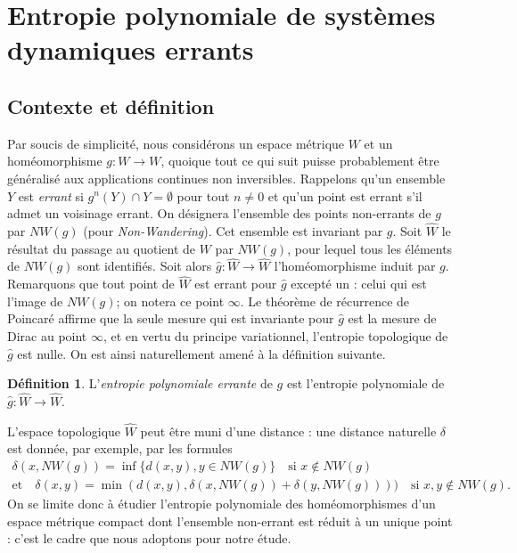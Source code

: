 \documentclass[11pt]{article}
\theoremstyle{definition}
\newtheorem{defi}[theo]{Définition}
\numberwithin{equation}{section}
\numberwithin{figure}{section}
\numberwithin{table}{section}
\let\hat\widehat
\begin{document}
\section{Entropie polynomiale de systèmes dynamiques errants}\label{s.wandering}

\subsection{Contexte et définition}

Par soucis de simplicité, nous considérons un espace métrique $W$ et un homéomorphisme $g: W \to W$, quoique tout ce qui suit puisse probablement être généralisé aux applications continues non inversibles. Rappelons qu'un ensemble $Y$ est \emph{errant} si $g^n(Y) \cap Y =\emptyset$ pour tout $n \neq 0$ et qu'un point est errant s'il admet un voisinage errant. On désignera l'ensemble des points non-errants de $g$ par $NW(g)$ (pour \emph{Non-Wandering}). Cet ensemble est invariant par $g$. Soit $\hat W$ le résultat du passage au quotient de $W$ par $NW(g)$, pour lequel tous les éléments de $NW(g)$ sont identifiés. Soit alors $\hat g: \hat W \to \hat W$ l'homéomorphisme induit par $g$. Remarquons que tout point de $\hat W$ est errant pour $\hat g$ excepté un : celui qui est l'image de $NW(g)$; on notera ce point $\infty$. Le théorème de récurrence de Poincaré affirme que la seule mesure qui est invariante pour $\hat g$ est la mesure de Dirac au point $\infty$, et en vertu du principe variationnel, l'entropie topologique de $\hat g$ est nulle. On est ainsi naturellement amené à la définition suivante.

\begin{defi}
L'\emph{entropie polynomiale errante} de $g$ est l'entropie polynomiale de $\hat g: \hat W \to \hat W$.
\end{defi}

L'espace topologique $\hat W$ peut être muni d'une distance : une distance naturelle $\delta$ est donnée, par exemple, par les formules
\begin{gather*}
\delta(x,NW(g))= \inf\{d(x,y), y \in NW(g)\} \quad\text{si } x \not \in NW(g)
\\
\text{et}\quad \delta(x,y) = \min(d(x,y), \delta(x,NW(g))+\delta(y,NW(g)))) \quad\text{si } x,y \not \in NW(g).
\end{gather*}
On se limite donc à étudier l'entropie polynomiale des homéomorphismes d'un espace métrique compact dont l'ensemble non-errant est réduit à un unique point : c'est le cadre que nous adoptons pour notre étude.
\end{document}
